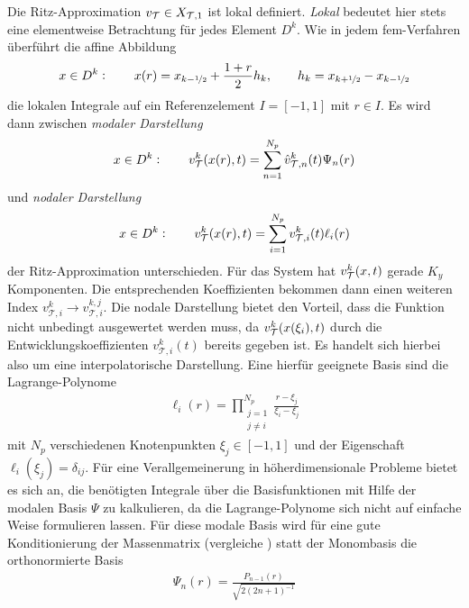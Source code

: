Die Ritz-Approximation $v_{\mathcal{T}} \in X_{\mathcal{T},1}$ ist lokal definiert. \emph{Lokal} bedeutet hier stets eine elementweise Betrachtung für jedes Element $D^k$. Wie in jedem \ac{fem}-Verfahren überführt die affine Abbildung
\begin{equation}
  x\in D^k : \qquad x(r) = x_{k-\nicefrac{1}{2}} + \frac{1+r}{2}h_k, \qquad h_k=x_{k+\nicefrac{1}{2}} - x_{k-\nicefrac{1}{2}}
  \label{eq:affmap}
\end{equation}
die lokalen Integrale auf ein Referenzelement $I=[-1,1]$ mit $r\in I$.
Es wird dann zwischen \emph{modaler Darstellung}
\begin{align}
  x\in D^k : \qquad v_{\mathcal{T}}^k(x(r),t) = \sum_{n=1}^{N_p}\hat{v}_{\mathcal{T},n}^k(t) \Psi_n(r)
\end{align}
und \emph{nodaler Darstellung}
\begin{align}
  x\in D^k : \qquad v_{\mathcal{T}}^k(x(r),t) = \sum_{i=1}^{N_p} v_{\mathcal{T},i}^k(t)\ell_i(r)
  \label{eq:nodal}
\end{align}
der Ritz-Approximation unterschieden. Für das System hat $v_{\mathcal{T}}^k(x,t)$ gerade $K_y$ Komponenten. Die entsprechenden Koeffizienten bekommen dann einen weiteren Index $v_{\mathcal{T},i}^k \rightarrow v_{\mathcal{T},i}^{k,j}$.
Die nodale Darstellung bietet den Vorteil, dass die Funktion nicht unbedingt ausgewertet werden muss, da $v_{\mathcal{T}}^k(x(\xi_i),t)$ durch die Entwicklungskoeffizienten $v_{\mathcal{T},i}^k(t)$ bereits gegeben ist. Es handelt sich hierbei also um eine interpolatorische Darstellung.
Eine hierfür geeignete Basis sind die Lagrange-Polynome
\begin{align}
  \ell_i(r) = \prod_{\substack{j=1 \\ j\neq i}}^{N_p} \frac{r-\xi_j}{\xi_i-\xi_j}
\end{align}
mit $N_p$ verschiedenen Knotenpunkten $\xi_j\in[-1,1]$ und der Eigenschaft ${\ell_i(\xi_j)=\delta_{ij}}$. Für eine Verallgemeinerung in höherdimensionale Probleme bietet es sich an, die benötigten Integrale über die Basisfunktionen mit Hilfe der modalen Basis $\Psi$ zu kalkulieren, da die Lagrange-Polynome sich nicht auf einfache Weise formulieren lassen. Für diese modale Basis wird für eine gute Konditionierung der Massenmatrix (vergleiche ) statt der Monombasis die orthonormierte Basis
\begin{align}
  \Psi_n(r) = \frac{P_{n-1}(r)}{\sqrt{2(2n+1)^{-1}}}
  \label{eq:modaleBasis}
\end{align}
